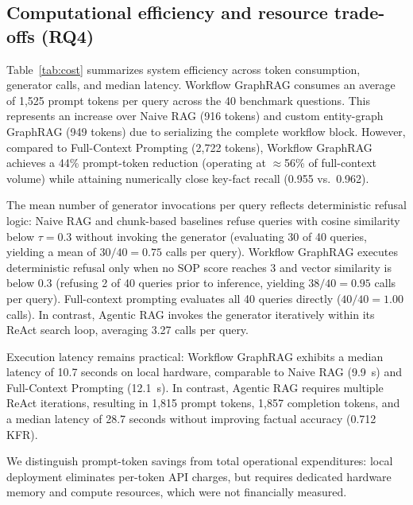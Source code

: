 \documentclass[preprint,10pt]{elsarticle}
\begin{document}
\subsection{Computational efficiency and resource trade-offs (RQ4)}
Table~\ref{tab:cost} summarizes system efficiency across token consumption, generator calls, and median latency. Workflow GraphRAG consumes an average of 1,525 prompt tokens per query across the 40 benchmark questions. This represents an increase over Naive RAG (916 tokens) and custom entity-graph GraphRAG (949 tokens) due to serializing the complete workflow block. However, compared to Full-Context Prompting (2,722 tokens), Workflow GraphRAG achieves a 44\% prompt-token reduction (operating at $\approx$56\% of full-context volume) while attaining numerically close key-fact recall (0.955 vs.\ 0.962).

\begin{table}[!htbp]
\centering
\caption{Operational resource consumption per query across evaluated systems: mean prompt and completion tokens, mean generator invocations, and median execution latency across all 40 questions.}
\label{tab:cost}
\small
\setlength{\tabcolsep}{4pt}
\resizebox{\textwidth}{!}{%
}
\end{table}

The mean number of generator invocations per query reflects deterministic refusal logic: Naive RAG and chunk-based baselines refuse queries with cosine similarity below $\tau = 0.3$ without invoking the generator (evaluating 30 of 40 queries, yielding a mean of $30/40 = 0.75$ calls per query). Workflow GraphRAG executes deterministic refusal only when no SOP score reaches 3 and vector similarity is below 0.3 (refusing 2 of 40 queries prior to inference, yielding $38/40 = 0.95$ calls per query). Full-context prompting evaluates all 40 queries directly ($40/40 = 1.00$ calls). In contrast, Agentic RAG invokes the generator iteratively within its ReAct search loop, averaging 3.27 calls per query.

Execution latency remains practical: Workflow GraphRAG exhibits a median latency of 10.7 seconds on local hardware, comparable to Naive RAG (9.9~s) and Full-Context Prompting (12.1~s). In contrast, Agentic RAG requires multiple ReAct iterations, resulting in 1,815 prompt tokens, 1,857 completion tokens, and a median latency of 28.7 seconds without improving factual accuracy (0.712 KFR).

We distinguish prompt-token savings from total operational expenditures: local deployment eliminates per-token API charges, but requires dedicated hardware memory and compute resources, which were not financially measured.
\end{document}
